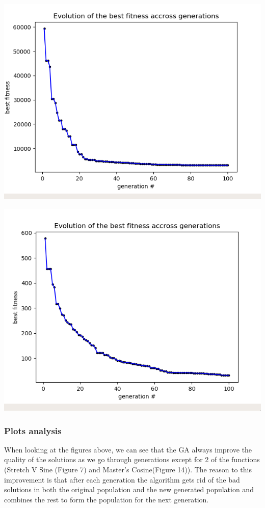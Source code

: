 \documentclass[12pt]{article}
\begin{document}
				\begin{minipage}{0.6\linewidth}
					\includegraphics[width=\linewidth]{17.png}
				\end{minipage}
				\hfill
				\begin{minipage}{0.6\linewidth}
					\includegraphics[width=\linewidth]{18.png}
				\end{minipage}
			\subsubsection{Plots analysis}
				When looking at the figures above, we can see that the GA always improve the quality of the solutions as we go through generations except for 2 of the functions (Stretch V Sine (Figure 7) and Master's Cosine(Figure 14)). The reason to this improvement is that after each generation the algorithm gets rid of the bad solutions in both the original population and the new generated population and combines the rest to form the population for the next generation.
		
\end{document}
